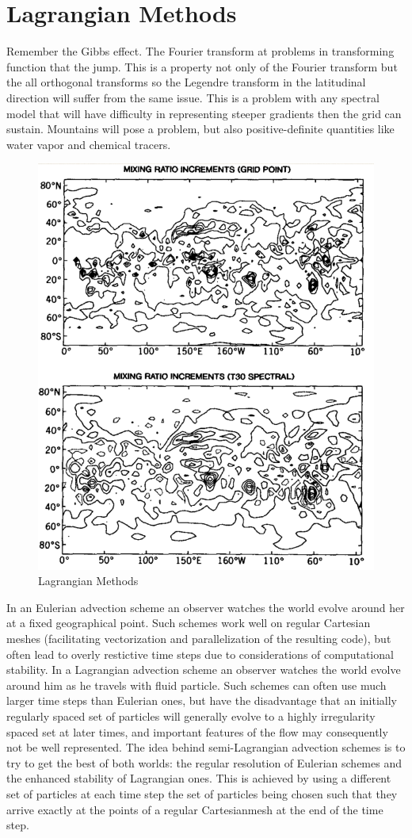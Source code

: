\section{Lagrangian Methods}
Remember the Gibbs effect. The Fourier transform at problems in
transforming function that the jump. This is a property not only of the
Fourier transform but the all orthogonal transforms so the Legendre
transform in the latitudinal direction will suffer from the same issue. This
is a problem with any spectral model that will have difficulty in
representing steeper gradients then the grid can sustain.
Mountains will pose a problem, but also positive-definite quantities like
water vapor and chemical tracers.

\begin{figure}[h!]
    \centering
    \includegraphics[width=0.5\linewidth]{uploads/Screenshot 2024-11-19 130213.png}
    \caption{Lagrangian Methods}
    \label{fig:lag method}
\end{figure}
In an Eulerian advection scheme an observer watches the world evolve around her at a fixed geographical point. Such schemes work well on regular Cartesian meshes (facilitating vectorization and parallelization of the resulting code), but often lead to overly restictive time steps due to considerations of computational stability. In a Lagrangian advection scheme an observer watches the world evolve around him as he travels with fluid particle. Such schemes can often use much larger time steps than Eulerian ones, but have the disadvantage that an initially regularly spaced set of particles will generally evolve to a highly irregularity spaced set at later times, and important features of the flow may consequently not be well represented. The idea behind semi-Lagrangian advection schemes is to try to get the best of both worlds: the regular resolution of Eulerian schemes and the enhanced stability of Lagrangian ones. This is achieved by using a different set of particles at each time step the set of particles being chosen such that they arrive exactly at the points of a regular Cartesianmesh at the end of the time step.
